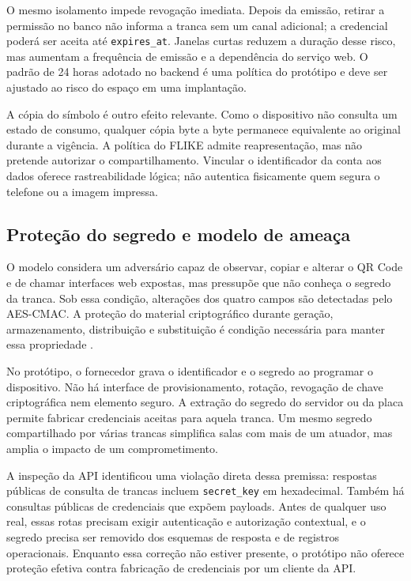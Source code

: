 O mesmo isolamento impede revogação imediata. Depois da emissão, retirar a permissão no banco não informa a tranca sem um canal adicional; a credencial poderá ser aceita até \texttt{expires\_at}. Janelas curtas reduzem a duração desse risco, mas aumentam a frequência de emissão e a dependência do serviço web. O padrão de 24 horas adotado no backend é uma política do protótipo e deve ser ajustado ao risco do espaço em uma implantação.

A cópia do símbolo é outro efeito relevante. Como o dispositivo não consulta um estado de consumo, qualquer cópia byte a byte permanece equivalente ao original durante a vigência. A política do FLIKE admite reapresentação, mas não pretende autorizar o compartilhamento. Vincular o identificador da conta aos dados oferece rastreabilidade lógica; não autentica fisicamente quem segura o telefone ou a imagem impressa.

\subsection{Proteção do segredo e modelo de ameaça}

O modelo considera um adversário capaz de observar, copiar e alterar o QR Code e de chamar interfaces web expostas, mas pressupõe que não conheça o segredo da tranca. Sob essa condição, alterações dos quatro campos são detectadas pelo AES-CMAC. A proteção do material criptográfico durante geração, armazenamento, distribuição e substituição é condição necessária para manter essa propriedade \cite{barker2020keymanagement}.

No protótipo, o fornecedor grava o identificador e o segredo ao programar o dispositivo. Não há interface de provisionamento, rotação, revogação de chave criptográfica nem elemento seguro. A extração do segredo do servidor ou da placa permite fabricar credenciais aceitas para aquela tranca. Um mesmo segredo compartilhado por várias trancas simplifica salas com mais de um atuador, mas amplia o impacto de um comprometimento.

A inspeção da API identificou uma violação direta dessa premissa: respostas públicas de consulta de trancas incluem \texttt{secret\_key} em hexadecimal. Também há consultas públicas de credenciais que expõem payloads. Antes de qualquer uso real, essas rotas precisam exigir autenticação e autorização contextual, e o segredo precisa ser removido dos esquemas de resposta e de registros operacionais. Enquanto essa correção não estiver presente, o protótipo não oferece proteção efetiva contra fabricação de credenciais por um cliente da API.

